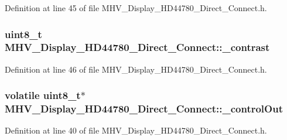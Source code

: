\-Definition at line 45 of file \-M\-H\-V\-\_\-\-Display\-\_\-\-H\-D44780\-\_\-\-Direct\-\_\-\-Connect.\-h.

\hypertarget{class_m_h_v___display___h_d44780___direct___connect_ae7c1f3a285e1ed271227fb68a5f83c38}{
\subsubsection[{\-\_\-contrast}]{\setlength{\rightskip}{0pt plus 5cm}uint8\-\_\-t {\bf \-M\-H\-V\-\_\-\-Display\-\_\-\-H\-D44780\-\_\-\-Direct\-\_\-\-Connect\-::\-\_\-contrast}}}
\label{class_m_h_v___display___h_d44780___direct___connect_ae7c1f3a285e1ed271227fb68a5f83c38}


\-Definition at line 46 of file \-M\-H\-V\-\_\-\-Display\-\_\-\-H\-D44780\-\_\-\-Direct\-\_\-\-Connect.\-h.

\hypertarget{class_m_h_v___display___h_d44780___direct___connect_a3d308de0a3d1f48dc28ec3a0cd416373}{
\subsubsection[{\-\_\-control\-Out}]{\setlength{\rightskip}{0pt plus 5cm}volatile uint8\-\_\-t$\ast$ {\bf \-M\-H\-V\-\_\-\-Display\-\_\-\-H\-D44780\-\_\-\-Direct\-\_\-\-Connect\-::\-\_\-control\-Out}}}
\label{class_m_h_v___display___h_d44780___direct___connect_a3d308de0a3d1f48dc28ec3a0cd416373}


\-Definition at line 40 of file \-M\-H\-V\-\_\-\-Display\-\_\-\-H\-D44780\-\_\-\-Direct\-\_\-\-Connect.\-h.

